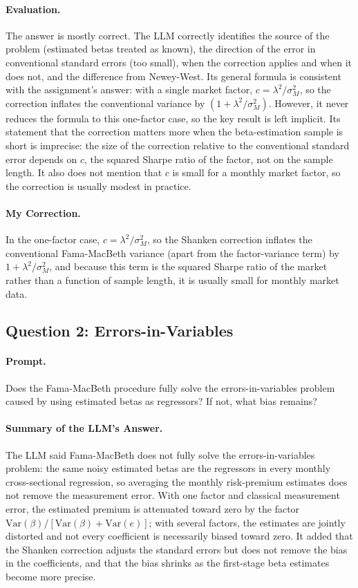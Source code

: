\paragraph{Evaluation.} The answer is mostly correct. The LLM correctly
identifies the source of the problem (estimated betas treated as known), the
direction of the error in conventional standard errors (too small), when the
correction applies and when it does not, and the difference from Newey-West.
Its general formula is consistent with the assignment's answer: with a single
market factor, $c = \lambda^2/\sigma_M^2$, so the correction inflates the
conventional variance by $(1 + \lambda^2/\sigma_M^2)$. However, it never
reduces the formula to this one-factor case, so the key result is left
implicit. Its statement that the correction matters more when the
beta-estimation sample is short is imprecise: the size of the correction
relative to the conventional standard error depends on $c$, the squared Sharpe
ratio of the factor, not on the sample length. It also does not mention that
$c$ is small for a monthly market factor, so the correction is usually modest
in practice.

\paragraph{My Correction.} In the one-factor case, $c = \lambda^2/\sigma_M^2$,
so the Shanken correction inflates the conventional Fama-MacBeth variance
(apart from the factor-variance term) by $1 + \lambda^2/\sigma_M^2$, and
because this term is the squared Sharpe ratio of the market rather than a
function of sample length, it is usually small for monthly market data.

\subsection{Question 2: Errors-in-Variables}

\paragraph{Prompt.} Does the Fama-MacBeth procedure fully solve the
errors-in-variables problem caused by using estimated betas as regressors? If
not, what bias remains?

\paragraph{Summary of the LLM's Answer.} The LLM said Fama-MacBeth does not
fully solve the errors-in-variables problem: the same noisy estimated betas are
the regressors in every monthly cross-sectional regression, so averaging the
monthly risk-premium estimates does not remove the measurement error. With one
factor and classical measurement error, the estimated premium is attenuated
toward zero by the factor
$\text{Var}(\beta)/[\text{Var}(\beta)+\text{Var}(e)]$; with several factors,
the estimates are jointly distorted and not every coefficient is necessarily
biased toward zero. It added that the Shanken correction adjusts the standard
errors but does not remove the bias in the coefficients, and that the bias
shrinks as the first-stage beta estimates become more precise.

